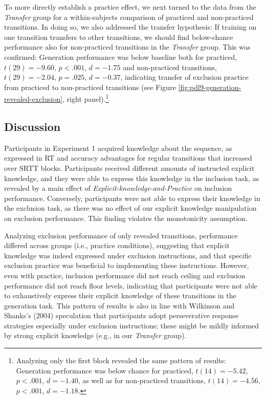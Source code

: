 \documentclass[man]{apa6}
\theoremstyle{definition}
\theoremstyle{definition}
\theoremstyle{definition}
\theoremstyle{remark}
\begin{document}
To more directly establish a practice effect, we next turned to the data
from the \emph{Transfer} group for a within-subjects comparison of
practiced and non-practiced transitions. In doing so, we also addressed
the transfer hypothesis: If training on one transition transfers to
other transitions, we should find below-chance performance also for
non-practiced transitions in the \emph{Transfer} group. This was
confirmed: Generation performance was below baseline both for practiced,
\(t(29) = -9.60\), \(p < .001\), \(d = -1.75\) and non-practiced
transitions, \(t(29) = -2.04\), \(p = .025\), \(d = -0.37\), indicating
transfer of exclusion practice from practiced to non-practiced
transitions (see Figure \ref{fig:pdl9-generation-revealed-exclusion},
right panel).\footnote{Analyzing only the first block revealed the same
  pattern of results: Generation performance was below chance for
  practiced, \(t(14) = -5.42\), \(p < .001\), \(d = -1.40\), as well as
  for non-practiced transitions, \(t(14) = -4.56\), \(p < .001\),
  \(d = -1.18\).}

\subsection{Discussion}\label{discussion}

Participants in Experiment 1 acquired knowledge about the sequence, as
expressed in RT and accuracy advantages for regular transitions that
increased over SRTT blocks. Participants received different amounts of
instructed explicit knowledge, and they were able to express this
knowledge in the inclusion task, as revealed by a main effect of
\emph{Explicit-knowledge-and-Practice} on inclusion performance.
Conversely, participants were not able to express their knowledge in the
exclusion task, as there was no effect of our explicit knowledge
manipulation on exclusion performance. This finding violates the
monotonicity assumption.

Analyzing exclusion performance of only revealed transitions,
performance differed across groups (i.e., practice conditions),
suggesting that explicit knowledge was indeed expressed under exclusion
instructions, and that specific exclusion practice was beneficial to
implementing these instructions. However, even with practice, inclusion
performance did not reach ceiling and exclusion performance did not
reach floor levels, indicating that participants were not able to
exhaustively express their explicit knowledge of these transitions in
the generation task. This pattern of results is also in line with
Wilkinson and Shanks's (2004) speculation that participants adopt
perseverative response strategies especially under exclusion
instructions; these might be mildly informed by strong explicit
knowledge (e.g., in our \emph{Transfer} group).
\end{document}
